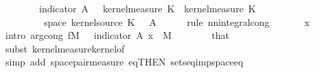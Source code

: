 \begin{isabellebody}
\ \ \ \ {\isasymintegral}\isactrlsup {\isacharplus}{\kern0pt}\ {\isasymomega}\ {\isasymintegral}\isactrlsup {\isacharplus}{\kern0pt}\ {\isasymomega}\ indicator\ A\ {\isacharparenleft}{\kern0pt}{\isasymomega}\ {\isasymomega}\ {\isasympartial}kernel{\isacharunderscore}{\kern0pt}measure\ K{\isacharunderscore}{\kern0pt}{}\ {\isasymomega}\ {\isasympartial}kernel{\isacharunderscore}{\kern0pt}measure\ K{\isacharunderscore}{\kern0pt}{}\ {\isasymomega}\isanewline
\ \ \ \ \ \ \ {\isachardoublequoteopen}{\isasymomega}\ {\isasymin}\ space\ {\isacharparenleft}{\kern0pt}kernel{\isacharunderscore}{\kern0pt}source\ K{\isacharunderscore}{\kern0pt}{}{\isacharparenright}{\kern0pt}{\isachardoublequoteclose}\ \ {\isasymomega}\ A\isanewline
\ \ \ \ \isamarkupfalse%
\ {\isacharparenleft}{\kern0pt}rule\ nn{\isacharunderscore}{\kern0pt}integral{\isacharunderscore}{\kern0pt}cong{\isacharparenright}{\kern0pt}\isanewline
\ \ \ \ \isamarkupfalse%
\ \ x\isanewline
\ \ \ \ \ \ \isamarkupfalse%
\ {\isacharparenleft}{\kern0pt}intro\ arg{\isacharunderscore}{\kern0pt}cong{\isacharbrackleft}{\kern0pt}\ f{\isacharequal}{\kern0pt}{\isachardoublequoteopen}{\isasymlambda}M{\isachardot}{\kern0pt}\ {\isasymintegral}\isactrlsup {\isacharplus}{\kern0pt}\ {\isasymomega}\ indicator\ A\ {\isacharparenleft}{\kern0pt}x{\isacharcomma}{\kern0pt}\ {\isasymomega}\ {\isasympartial}M{\isachardoublequoteclose}{\isacharbrackright}{\kern0pt}{\isacharparenright}{\kern0pt}\isanewline
\ \ \ \ \ \ \isamarkupfalse%
\ that\ \isamarkupfalse%
\ {\isacharparenleft}{\kern0pt}subst\ kernel{\isacharunderscore}{\kern0pt}measure{\isacharunderscore}{\kern0pt}kernel{\isacharunderscore}{\kern0pt}of{\isacharparenright}{\kern0pt}\isanewline
\ \ \ \ \ \ \ \ \isamarkupfalse%
\ {\isacharparenleft}{\kern0pt}simp\ add{\isacharcolon}{\kern0pt}\ space{\isacharunderscore}{\kern0pt}pair{\isacharunderscore}{\kern0pt}measure\ eq{\isacharbrackleft}{\kern0pt}THEN\ sets{\isacharunderscore}{\kern0pt}eq{\isacharunderscore}{\kern0pt}imp{\isacharunderscore}{\kern0pt}space{\isacharunderscore}{\kern0pt}eq{\isacharbrackright}{\kern0pt}{\isacharparenright}{\kern0pt}\isanewline

\end{isabellebody}
